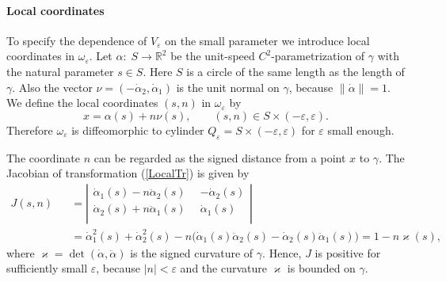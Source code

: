 \documentclass[graybox]{svmult}
\renewcommand{\kappa}{\varkappa}
\newcommand{\Real}{\mathbb R}
\newcommand{\eps}{\varepsilon}
\begin{document}
\paragraph{Local coordinates}
To specify  the dependence of $V_\eps$ on the small parameter  we introduce  local coordinates in $\omega_\eps$. Let $\alpha\colon\; S\to \Real^2$ be the unit-speed $C^2$-parametrization of $\gamma$ with the natural parameter $s\in S$. Here $S$ is a circle of the same length as the length of $\gamma$.  Also
the vector $\nu=(-\dot{\alpha}_2, \dot{\alpha}_1)$ is the unit normal on $\gamma$, because  $\|\dot{\alpha}\|=1$.
We define the local coordinates $(s,n)$ in $\omega_\eps$ by
\begin{equation}\label{LocalTr}
    x=\alpha(s)+n\nu(s), \qquad (s,n)\in S\times (-\eps, \eps).
\end{equation}
Therefore  $\omega_\eps$ is diffeomorphic to cylinder $Q_\eps=S\times(-\eps,\eps)$ for $\eps$ small enough.

The coordinate $n$ can be regarded as the signed distance from a point $x$ to $\gamma$. The Jacobian of transformation (\ref{LocalTr}) is given by
\begin{eqnarray}\nonumber
J(s,n)&&=
\left|
        \begin{array}{cr}
          \dot{\alpha}_1(s)-n\ddot{\alpha}_2(s)\phantom{0} &  -\dot{\alpha}_2(s)\\
          \dot{\alpha}_2(s)+n\ddot{\alpha}_1(s)\phantom{0} & \dot{\alpha}_1(s)\\
        \end{array}
      \right|\\\nonumber
&&=\dot{\alpha}_1^2(s)+\dot{\alpha}_2^2(s)
-n\big(\dot{\alpha}_1(s)\ddot{\alpha}_2(s)-
  \dot{\alpha}_2(s)\ddot{\alpha}_1(s)\big)=1-n \kappa(s),
\end{eqnarray}
where $\kappa=\det(\dot{\alpha},\ddot{\alpha})$ is the signed curvature of $\gamma$. Hence, $J$ is positive for sufficiently small $\eps$, because $|n|<\eps$ and the curvature $\kappa$  is  bounded on $\gamma$.
\end{document}
